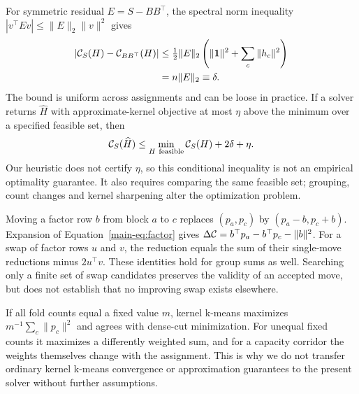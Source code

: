 For symmetric residual $E=S-BB^\top$, the spectral norm inequality
$|v^\top E v|\le\|E\|_2\|v\|^2$ gives
\begin{align}
 |\mathcal{C}_S(H)-\mathcal{C}_{BB^\top}(H)|
 &\le\tfrac12\|E\|_2\left(\|\mathbf{1}\|^2+\sum_c\|h_c\|^2\right)\\
 &=n\|E\|_2\equiv\delta.
 \label{eq:bound}
\end{align}
The bound is uniform across assignments and can be loose in practice. If a solver
returns $\widehat H$ with approximate-kernel objective at most $\eta$ above the
minimum over a specified feasible set, then
\begin{equation}
 \cut_S(\widehat H)\le\min_{H\ \mathrm{feasible}}\cut_S(H)+2\delta+\eta.
\end{equation}
Our heuristic does not certify $\eta$, so this conditional inequality is not an
empirical optimality guarantee. It also requires comparing the same feasible set;
grouping, count changes and kernel sharpening alter the optimization problem.

Moving a factor row $b$ from block $a$ to $c$ replaces $(p_a,p_c)$ by
$(p_a-b,p_c+b)$. Expansion of Equation~\ref{main-eq:factor} gives
$\Delta\mathcal{C}=b^\top p_a-b^\top p_c-\|b\|^2$. For a swap of factor rows $u$ and $v$,
the reduction equals the sum of their single-move reductions minus $2u^\top v$.
These identities hold for group sums as well. Searching only a finite set of swap
candidates preserves the validity of an accepted move, but does not establish
that no improving swap exists elsewhere.

If all fold counts equal a fixed value $m$, kernel k-means maximizes
$m^{-1}\sum_c\|p_c\|^2$ and agrees with dense-cut minimization. For unequal fixed
counts it maximizes a differently weighted sum, and for a capacity corridor the
weights themselves change with the assignment. This is why we do not transfer
ordinary kernel k-means convergence or approximation guarantees to the present
solver without further assumptions.

